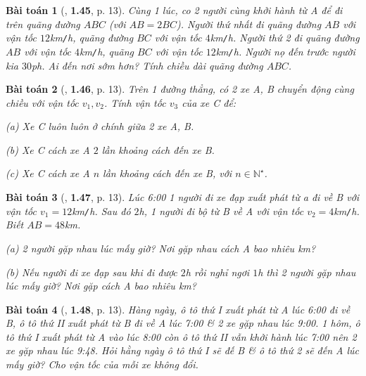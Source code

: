 \documentclass{article}
\numberwithin{equation}{section}
\newtheorem{baitoan}{Bài toán}[section]
\begin{document}
\begin{baitoan}[\cite{Van2022}, \textbf{1.45}, p. 13]
	Cùng 1 lúc, co 2 người cùng khởi hành từ A để đi trên quãng đường $ABC$ (với $AB = 2BC$). Người thứ nhất đi quãng đường $AB$ với vận tốc $12$\emph{km\texttt{/}h}, quãng đường $BC$ với vận tốc $4$\emph{km\texttt{/}h}. Người thứ 2 đi quãng đường $AB$ với vận tốc $4$\emph{km\texttt{/}h}, quãng $BC$ với vận tốc $12$\emph{km\texttt{/}h}. Người nọ đến trước người kia $30$\emph{ph}. Ai đến nơi sớm hơn? Tính chiều dài quãng đường $ABC$.
\end{baitoan}

\begin{baitoan}[\cite{Van2022}, \textbf{1.46}, p. 13]
	Trên 1 đường thẳng, có 2 xe A, B chuyển động cùng chiều với vận tốc $v_1,v_2$. Tính vận tốc $v_3$ của xe C để:
	\begin{enumerate*}
		\item[(a)] Xe C luôn luôn ở chính giữa 2 xe A, B.
		\item[(b)] Xe C cách xe A $2$ lần khoảng cách đến xe B.
		\item[(c)] Xe C cách xe A $n$ lần khoảng cách đến xe B, với $n\in\mathbb{N}^\star$.
	\end{enumerate*}
\end{baitoan}

\begin{baitoan}[\cite{Van2022}, \textbf{1.47}, p. 13]
	Lúc 6:00 1 người đi xe đạp xuất phát từ a đi về B với vận tốc $v_1 = 12$\emph{km\texttt{/}h}. Sau đó $2$\emph{h}, 1 người đi bộ từ B về A với vận tốc $v_2 = 4$\emph{km\texttt{/}h}. Biết $AB = 48$\emph{km}.
	\begin{enumerate*}
		\item[(a)] 2 người gặp nhau lúc mấy giờ? Nơi gặp nhau cách A bao nhiêu \emph{km}?
		\item[(b)] Nếu người đi xe đạp sau khi đi được $2$\emph{h} rồi nghỉ ngơi $1$\emph{h} thì 2 người gặp nhau lúc mấy giờ? Nơi gặp cách A bao nhiêu \emph{km}?
	\end{enumerate*}
\end{baitoan}

\begin{baitoan}[\cite{Van2022}, \textbf{1.48}, p. 13]
	Hàng ngày, ô tô thứ I xuất phát từ A lúc 6:00 đi về B, ô tô thứ II xuất phát từ B đi về A lúc 7:00 \& 2 xe gặp nhau lúc 9:00. 1 hôm, ô tô thứ I xuất phát từ A vào lúc 8:00 còn ô tô thứ II vẫn khởi hành lúc 7:00 nên 2 xe gặp nhau lúc 9:48. Hỏi hằng ngày ô tô thứ I sẽ đế B \& ô tô thứ 2 sẽ đến A lúc mấy giờ? Cho vận tốc của mỗi xe không đổi.
\end{baitoan}
\end{document}

